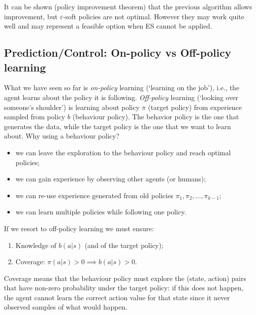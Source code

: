 It can be shown (policy improvement theorem) that the previous algorithm allows improvement, but $\varepsilon$-soft policies are not optimal. However they may work quite well and may represent a feasible option when ES cannot be applied. 

\subsection{Prediction/Control: On-policy vs Off-policy learning}
What we have seen so far is \textit{on-policy} learning (`learning on the job'), i.e., the agent learns about the policy it is following. \textit{Off-policy} learning (`looking over someone's shoulder') is learning about policy $\pi$ (target policy) from experience sampled from policy $b$ (behaviour policy). The behavior policy is the one that generates the data, while the target policy is the one that we want to learn about.
Why using a behaviour policy?
\begin{itemize}
  \item we can leave the exploration to the behaviour policy and reach optimal policies;
  \item we can gain experience by observing other agents (or humans);
  \item we can re-use experience generated from old policies $\pi_1,\pi_2,\dots,\pi_{k-1}$;
  \item we can learn multiple policies while following one policy.
\end{itemize}
If we resort to off-policy learning we must ensure:
\begin{enumerate}
  \item Knowledge of $b(a|s)$ (and of the target policy);
  \item Coverage: $\pi(a|s)>0 \implies b(a|s)>0$.
\end{enumerate}
Coverage means that the behaviour policy must explore the (state, action) pairs that have non-zero probability under the target policy: if this does not happen, the agent cannot learn the correct action value for that state since it never observed samples of what would happen.

